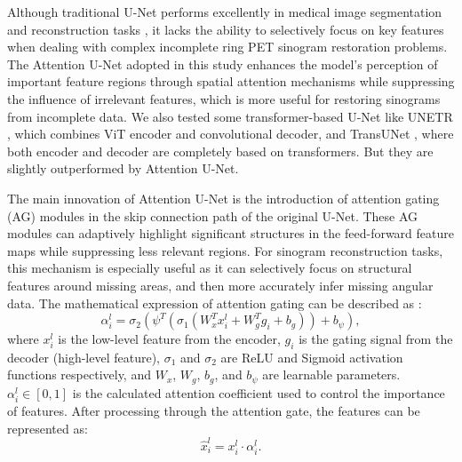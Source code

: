\documentclass[12pt]{iopart}
\begin{document}
Although traditional U-Net performs excellently in medical image segmentation and reconstruction tasks \cite{ronneberger2015unetconvolutionalnetworksbiomedical}, it lacks the ability to selectively focus on key features when dealing with complex incomplete ring PET sinogram restoration problems. The Attention U-Net \cite{oktay2018attentionunetlearninglook} adopted in this study enhances the model's perception of important feature regions through spatial attention mechanisms while suppressing the influence of irrelevant features, which is more useful for restoring sinograms from incomplete data. We also tested some transformer-based U-Net like UNETR \cite{hatamizadeh2021unetrtransformers3dmedical}, which combines ViT encoder and convolutional decoder, and TransUNet \cite{chen2021transunettransformersmakestrong}, where both encoder and decoder are completely based on transformers. But they are slightly outperformed by Attention U-Net.

The main innovation of Attention U-Net is the introduction of attention gating (AG) modules in the skip connection path of the original U-Net. These AG modules can adaptively highlight significant structures in the feed-forward feature maps while suppressing less relevant regions. 
For sinogram reconstruction tasks, this mechanism is especially useful as it can selectively focus on structural features around missing areas, and then more accurately infer missing angular data. The mathematical expression of attention gating can be described as \cite{oktay2018attentionunetlearninglook}:
\begin{equation}
\alpha_i^l = \sigma_2(\psi^T(\sigma_1(W_x^T x_i^l + W_g^T g_i + b_g)) + b_\psi),
\end{equation}
where $x_i^l$ is the low-level feature from the encoder, $g_i$ is the gating signal from the decoder (high-level feature), $\sigma_1$ and $\sigma_2$ are ReLU and Sigmoid activation functions respectively, and $W_x$, $W_g$, $b_g$, and $b_\psi$ are learnable parameters. $\alpha_i^l \in [0,1]$ is the calculated attention coefficient used to control the importance of features.
After processing through the attention gate, the features can be represented as:
\begin{equation}
\hat{x}_i^l = x_i^l \cdot \alpha_i^l.
\end{equation}
\end{document}
